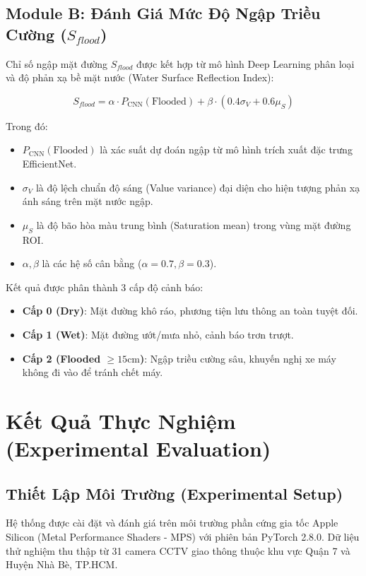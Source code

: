 \documentclass[conference]{IEEEtran}
\begin{document}
\subsection{Module B: Đánh Giá Mức Độ Ngập Triều Cường ($S_{flood}$)}
Chỉ số ngập mặt đường $S_{flood}$ được kết hợp từ mô hình Deep Learning phân loại và độ phản xạ bề mặt nước (Water Surface Reflection Index):

\begin{equation}
S_{flood} = \alpha \cdot P_{\text{CNN}}(\text{Flooded}) + \beta \cdot \left( 0.4 \sigma_{V} + 0.6 \mu_{S} \right)
\end{equation}

Trong đó:
\begin{itemize}
    \item $P_{\text{CNN}}(\text{Flooded})$ là xác suất dự đoán ngập từ mô hình trích xuất đặc trưng EfficientNet.
    \item $\sigma_{V}$ là độ lệch chuẩn độ sáng (Value variance) đại diện cho hiện tượng phản xạ ánh sáng trên mặt nước ngập.
    \item $\mu_{S}$ là độ bão hòa màu trung bình (Saturation mean) trong vùng mặt đường ROI.
    \item $\alpha, \beta$ là các hệ số cân bằng ($\alpha = 0.7, \beta = 0.3$).
\end{itemize}

Kết quả được phân thành 3 cấp độ cảnh báo:
\begin{itemize}
    \item \textbf{Cấp 0 (Dry)}: Mặt đường khô ráo, phương tiện lưu thông an toàn tuyệt đối.
    \item \textbf{Cấp 1 (Wet)}: Mặt đường ướt/mưa nhỏ, cảnh báo trơn trượt.
    \item \textbf{Cấp 2 (Flooded $\ge 15\text{cm}$)}: Ngập triều cường sâu, khuyến nghị xe máy không đi vào để tránh chết máy.
\end{itemize}

\section{Kết Quả Thực Nghiệm (Experimental Evaluation)}

\subsection{Thiết Lập Môi Trường (Experimental Setup)}
Hệ thống được cài đặt và đánh giá trên môi trường phần cứng gia tốc Apple Silicon (Metal Performance Shaders - MPS) với phiên bản PyTorch 2.8.0. Dữ liệu thử nghiệm thu thập từ 31 camera CCTV giao thông thuộc khu vực Quận 7 và Huyện Nhà Bè, TP.HCM.
\end{document}
